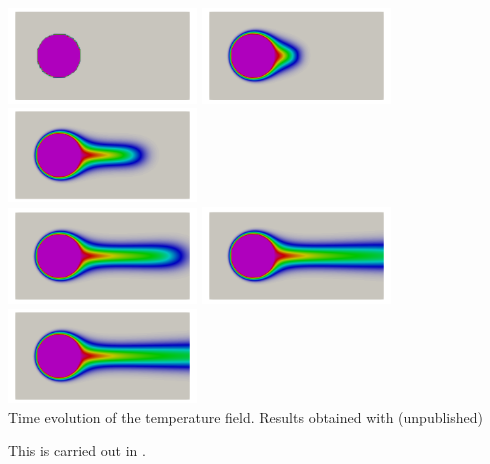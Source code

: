 \begin{center}
\includegraphics[width=5cm]{images/benchmark_heatcyl/temper_0000}
\includegraphics[width=5cm]{images/benchmark_heatcyl/temper_0020}
\includegraphics[width=5cm]{images/benchmark_heatcyl/temper_0040}\\
\includegraphics[width=5cm]{images/benchmark_heatcyl/temper_0060}
\includegraphics[width=5cm]{images/benchmark_heatcyl/temper_0080}
\includegraphics[width=5cm]{images/benchmark_heatcyl/temper_0150}\\
{\captionfont Time evolution of the temperature field.
Results obtained with \elefant (unpublished)}
\end{center}

This is carried out in .

